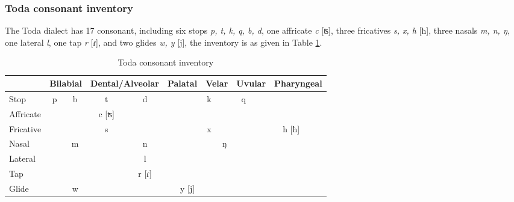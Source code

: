 \documentclass[12pt]{article}
\newcommand{\stof}{Toda\xspace}
\begin{document}
\subsubsection{Toda consonant inventory}

The \stof dialect has 17 consonant, including six stops \textit{p, t, k, q, b, d}, one affricate \textit{c} [ʦ], three fricatives \textit{s, x, h} [ħ], three nasals \textit{m, n, ŋ}, one lateral \textit{l}, one tap \textit{r} [ɾ], and two glides \textit{w, y} [j], the inventory is as given in Table \ref{tab:toC}.

\begin{table}[!htbp]
\centering
\caption{Toda consonant inventory}
\label{tab:toC}
\begin{tabular}{l|cc|cc|cc|cc|cc|cc}
\hline
                    & \multicolumn{2}{c|}{Bilabial} & \multicolumn{2}{c|}{Dental/Alveolar} & \multicolumn{2}{c|}{Palatal} & \multicolumn{2}{c|}{Velar} & \multicolumn{2}{c|}{Uvular} & \multicolumn{2}{c}{Pharyngeal} \\ \hline
Stop                & p            & b           & t               & d               &             &               & k          &            & q            &            &                 &              \\
Affricate           &               &              & c [ʦ]              &                  &             &               &             &             &               &            &                 &              \\
Fricative           &               &              & s               &                  &             &               & x          &             &               &            & h [ħ]             &              \\
Nasal               &               & m           &                  & n               &             &               &             & ŋ          &               &            &                 &              \\
Lateral &               &              &                  & l               &             &               &             &             &               &            &                 &              \\
Tap                 &               &              &                  & r [ɾ]              &             &               &             &             &               &            &                 &              \\
Glide               &               & w           &                  &                  &             & y [j]           &             &             &               &            &                 &              \\ \hline
\end{tabular}
\end{table}
\end{document}
